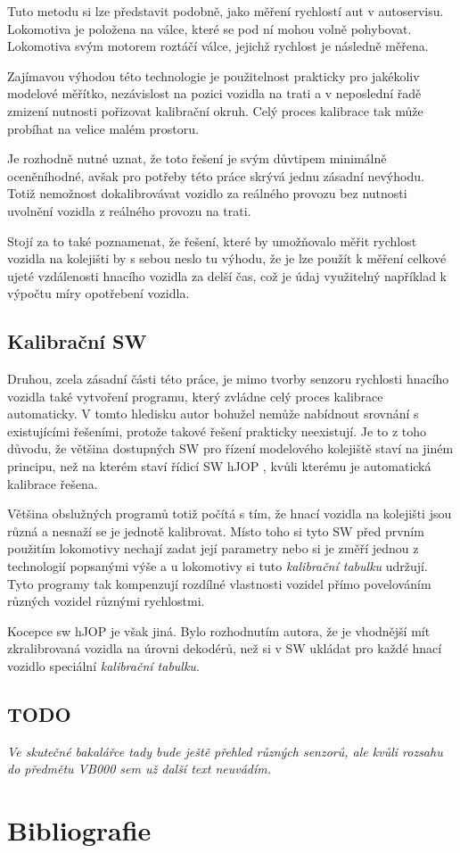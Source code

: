 \documentclass[12pt,a4paper]{article}
\begin{document}
Tuto metodu si lze představit podobně, jako měření rychlostí aut v autoservisu.
Lokomotiva je položena na válce, které se pod ní mohou volně pohybovat. Lokomotiva
svým motorem roztáčí válce, jejichž rychlost je následně měřena.

Zajímavou výhodou této technologie je použitelnost prakticky pro jakékoliv
modelové měřítko, nezávislost na pozici vozidla na trati a v neposlední řadě
zmizení nutnosti pořizovat kalibrační okruh. Celý proces kalibrace tak může
probíhat na velice malém prostoru.

Je rozhodně nutné uznat, že toto řešení je svým důvtipem minimálně oceněníhodné,
avšak pro potřeby této práce skrývá jednu zásadní nevýhodu. Totiž nemožnost
dokalibrovávat vozidlo za reálného provozu bez nutnosti uvolnění vozidla
z reálného provozu na trati.

Stojí za to také poznamenat, že řešení, které by umožňovalo měřit rychlost vozidla
na kolejišti by s sebou neslo tu výhodu, že je lze použít k měření celkové
ujeté vzdálenosti hnacího vozidla za delší čas, což je údaj využitelný například
k výpočtu míry opotřebení vozidla.

\subsection{Kalibrační SW}

Druhou, zcela zásadní části této práce, je mimo tvorby senzoru rychlosti hnacího
vozidla také vytvoření programu, který zvládne celý proces kalibrace automaticky.
V tomto hledisku autor bohužel nemůže nabídnout srovnání s existujícími řešeními,
protože takové řešení prakticky neexistují. Je to z toho důvodu, že většina
dostupných SW pro řízení modelového kolejiště staví na jiném principu, než na
kterém staví řídicí SW hJOP \cite{hjop:web}, kvůli kterému je automatická kalibrace
řešena.

Většina obslužných programů totiž počítá s tím, že hnací vozidla na kolejišti
jsou různá a nesnaží se je jednotě kalibrovat. Místo toho si tyto SW před prvním
použitím lokomotivy nechají zadat její parametry nebo si je změří jednou
z technologií popsanými výše a u lokomotivy si tuto \textit{kalibrační tabulku}
udržují. Tyto programy tak kompenzují rozdílné vlastnosti vozidel přímo povelováním
různých vozidel různými rychlostmi.

Kocepce sw hJOP je však jiná. Bylo rozhodnutím autora, že je vhodnější mít
zkralibrovaná vozidla na úrovni dekodérů, než si v SW ukládat pro každé hnací
vozidlo speciální \textit{kalibrační tabulku}.

\subsection{TODO}

\textit{Ve skutečné bakalářce tady bude ještě přehled různých senzorů, ale
kvůli rozsahu do předmětu VB000 sem už další text neuvádím.}

\section*{Bibliografie}
\printbibliography[heading=none]
\end{document}
